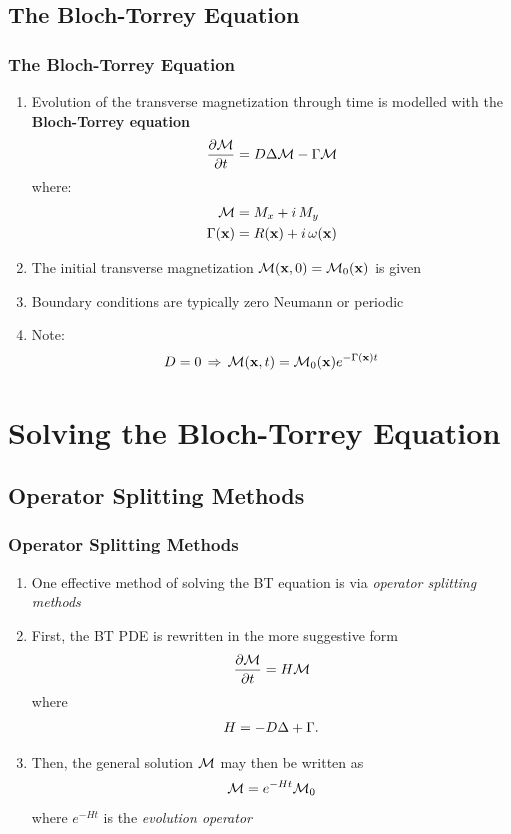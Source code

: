 \subsection{The Bloch-Torrey Equation}

\begin{frame}
\frametitle{The Bloch-Torrey Equation}
\begin{enumerate}
    \item Evolution of the transverse magnetization through time is modelled with the \textbf{Bloch-Torrey equation}
    $$ \frac{\partial \mathcal{M}}{\partial t} = D \mbox{$\Delta$}{\mathcal{M}} - \Gamma \mathcal{M} $$
    where:
    \begin{align*}
        \mathcal{M} &= M_x + i \, M_y \\
        \Gamma(\mathbf{x}) &= R(\mathbf{x}) + i \, \omega(\mathbf{x})
    \end{align*}
    \item The initial transverse magnetization $\mathcal{M}(\mathbf{x},0) = \mathcal{M}_0(\mathbf{x})$ is given
    \item Boundary conditions are typically zero Neumann or periodic
    \item Note:
    $$ D = 0 \, \Rightarrow \, \mathcal{M}(\mathbf{x},t) = \mathcal{M}_0(\mathbf{x}) e^{-\Gamma(\mathbf{x}) t} $$
\end{enumerate}
\end{frame}

\section{Solving the Bloch-Torrey Equation}


\subsection{Operator Splitting Methods}

\begin{frame}
\frametitle{Operator Splitting Methods}
\begin{enumerate}
    \item One effective method of solving the BT equation is via \textit{operator splitting methods}
    \item First, the BT PDE is rewritten in the more suggestive form
    $$ \frac{\partial \mathcal{M}}{\partial t} = H \mathcal{M} $$
    where
    \begin{gather*}
        H = -D \mbox{$\Delta$}{} + \Gamma.
    \end{gather*}
    \item Then, the general solution $\mathcal{M}$ may then be written as
    $$ \mathcal{M} = e^{-Ht}\mathcal{M}_0 $$
    where $e^{-Ht}$ is the \textit{evolution operator}
\end{enumerate}
\end{frame}

